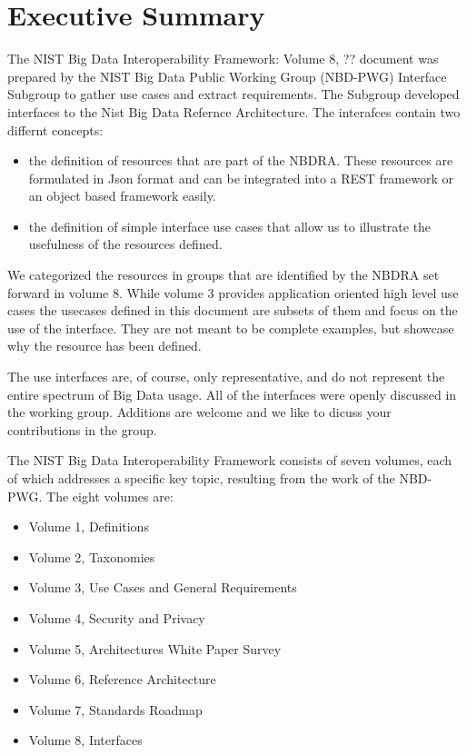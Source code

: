 \section*{Executive Summary}

The NIST Big Data Interoperability Framework: Volume 8, ??
document was prepared by the NIST Big Data Public Working Group (NBD-PWG) Interface Subgroup to gather use cases and extract requirements. The Subgroup developed interfaces to the Nist Big Data Refernce Architecture. The interafces contain two differnt concepts:

\begin{itemize}

\item the definition of resources that are part of the NBDRA. These resources are formulated in Json format and can be integrated into a REST framework or an object based framework easily.

\item the definition of simple interface use cases that allow us to illustrate the usefulness of the resources defined. 

\end{itemize} 

We categorized the resources in groups that are identified by the NBDRA set forward in volume 8. While volume 3 provides application oriented high level use cases the usecases defined in this document are subsets of them and focus on the use of the interface. They are not meant to be complete examples, but showcase why the resource has been defined.




The use interfaces are, of course, only representative, and do not represent the entire spectrum of Big Data
usage. All of the interfaces were openly discussed in the working group. Additions are welcome and we like to dicuss your contributions in the group.

The NIST Big Data Interoperability Framework consists of seven volumes, each of which addresses a
specific key topic, resulting from the work of the NBD-PWG. The eight volumes are:

\begin{itemize}
\item Volume 1, Definitions
\item Volume 2, Taxonomies
\item Volume 3, Use Cases and General Requirements
\item Volume 4, Security and Privacy
\item Volume 5, Architectures White Paper Survey
\item Volume 6, Reference Architecture
\item Volume 7, Standards Roadmap
\item Volume 8, Interfaces
\end{itemize}

